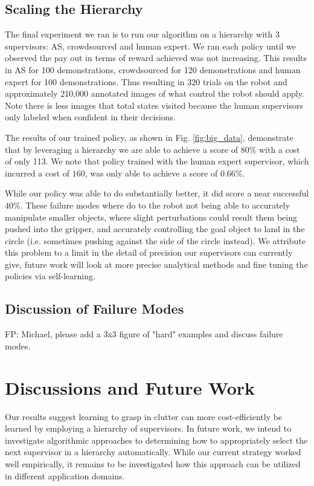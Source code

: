\documentclass[10pt, conference]{ieeeconf}      %
\begin{document}
\subsection{Scaling the Hierarchy}
The final experiment we ran is to run our algorithm on a hierarchy with 3 supervisors: AS, crowdsourced and human
expert. We ran each policy until we observed the pay out in terms of reward achieved was not increasing. This results in
AS for 100 demonstrations, crowdsourced for 120 demonstrations and human expert for 100 demonstrations. Thus resulting in 320 trials on the robot and approximately 210,000 annotated images of what control the robot should apply. Note there is less images that total states visited because the human supervisors only labeled when confident in their decisions. 

The results of our trained policy, as shown in Fig. \ref{fig:big_data}, demonstrate that by leveraging a hierarchy we are able to achieve a score of $80\%$ with a cost of only 113. We note that policy trained with the human expert supervisor, which incurred a cost of $160$, was only able to achieve a score of $0.66\%$. 

While our policy was able to do substantially better, it did score a near successful  $40\%$. These failure modes where do to the robot not being able to accurately manipulate smaller objects, where slight perturbations could result them being pushed into the gripper, and accurately controlling the goal object to land in the circle (i.e. sometimes pushing against the side of the circle instead). We attribute this problem to a limit in the detail of precision our supervisors can currently give, future work will look at more precise analytical methods and fine tuning the policies via self-learning. 

\subsection{Discussion of Failure Modes}
{\color{blue} FP: Michael, please add a 3x3 figure of "hard" examples and discuss failure modes.}

\section{Discussions and Future Work}
Our results suggest learning to grasp in clutter can more cost-efficiently be learned by employing a hierarchy of
supervisors. In future work, we intend to investigate algorithmic approaches to determining how to appropriately select
the next supervisor in a hierarchy automatically. While our current strategy worked well empirically, it remains to be 
investigated how this approach can be utilized in different application domains.
\end{document}
